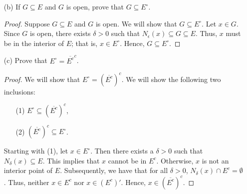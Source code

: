 \documentclass[a4paper]{article}
\begin{document}
\begin{enumerate}
\begin{enumerate}
\begin{proof}
                    Now, let \( x \in E^{\circ} \). Then there exists \( \epsilon > 0  \) such that \( {N}_{\epsilon}(x) \subseteq E  \) where \( x \in E  \). Suppose for sake of contradiction that \( x  \) is NOT in the interior of \( E^{\circ}  \). Then for all \( \delta > 0  \), \( {N}_{\delta}(x) \not\subseteq E^{\circ}  \). That is, \( {N}_{\delta}(x) \cap (E^{\circ})^{c} \neq \emptyset  \). Since \( E^{\circ} \subseteq E  \), it follows that \( x \in E^{c} \). But this is a contradiction because we had assume that \( x \in E^{\circ}  \) and so \( x \in E  \). Thus, we must have \( x  \) lie in the interior of \( E^{\circ} \). 
                From (1) and (2), we conclude that \( E^{\circ} \) is open.
                    \end{proof}
                \item[(b)] If \( G \subseteq E   \) and \( G  \) is open, prove that \( G \subseteq E^{\circ} \).
                    \begin{proof}
                    Suppose \( G \subseteq E  \) and \( G  \) is open. We will show that \( G \subseteq E^{\circ} \). Let \( x \in G  \). Since \( G  \) is open, there exists \( \delta > 0  \) such that \( {N}_{\epsilon}(x) \subseteq G \subseteq E   \). Thus, \( x  \) must be in the interior of \( E  \); that is, \( x \in E^{\circ} \). Hence, \( G \subseteq E^{\circ} \).
                    \end{proof}
                \item[(c)] Prove that \( E^{\circ} = \overline{E^{c}}^{c} \).
                    \begin{proof}
                    We will show that \( E^{\circ} = (\overline{E^{c}})^{c} \). We will show the following two inclusions:        
                    \begin{enumerate}
                        \item[(1)] \( E^{\circ} \subseteq  (\overline{E^{c}})^{c} \),
                        \item[(2)] \(  (\overline{E^{c}})^{c} \subseteq E^{\circ}\).
                    \end{enumerate}
                    Starting with (1), let \( x \in E^{\circ} \). Then there exists a \( \delta > 0 \) such that \( {N}_{\delta}(x) \subseteq  E   \). This implies that \( x  \) cannot be in \( E^{c} \). Otherwise, \( x  \) is not an interior point of \( E  \). Subsequently, we have that for all \( \delta > 0  \), \( {N}_{\delta}(x) \cap E^{c} = \emptyset \). Thus, neither \( x \in E^{c}  \) nor \( x \in (E^{c})' \). Hence, \( x \in (\overline{E^{c}})^{c} \).    


\end{proof}
\end{enumerate}
\end{enumerate}
\end{document}
